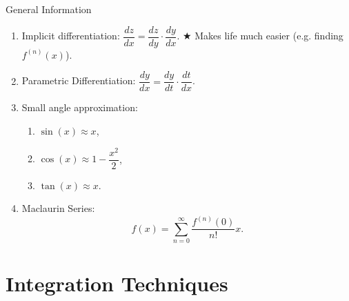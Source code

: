 \documentclass[oneside]{book}
\begin{document}
\begin{stbox}{General Information}
\begin{enumerate}
\begin{center}
\begin{tabular}{|Sc|Sc|}
        \hline
        \(a^x\) & \(a^x \ln(a)\)\\
        \hline
      \end{tabular}
    \end{center}
    \item Implicit differentiation: \(\dfrac{dz}{dx}=\dfrac{dz}{dy}\cdot \dfrac{dy}{dx}\). \(\bigstar\) Makes life much easier (e.g. finding \(f^{(n)}(x)\)). 
    \item Parametric Differentiation: \(\dfrac{dy}{dx}=\dfrac{dy}{dt}\cdot \dfrac{dt}{dx}\).
    \item Small angle approximation: 
    \begin{enumerate}
      \item \(\sin(x) \approx x\),
      \item \(\cos(x) \approx 1-\dfrac{x^2}{2}\),
      \item \(\tan(x) \approx x\).
    \end{enumerate}
    \item Maclaurin Series: 
    \[f(x)=\sum_{n=0}^{\infty}\dfrac{f^{(n)}(0)}{n!}x.\]
  \end{enumerate}
\end{stbox}
\chapter{Integration Techniques}
\end{document}
